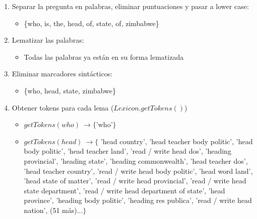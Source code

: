 \begin{enumerate}
  \item Separar la pregunta en palabras, eliminar puntuaciones y pasar a lower case:
  \begin{itemize}
    \item \{who, is, the, head, of, state, of, zimbabwe\}
  \end{itemize}
  \item Lematizar las palabras:
  \begin{itemize}
    \item Todas las palabras ya están en su forma lematizada
  \end{itemize}
  \item Eliminar marcadores sintácticos:
  \begin{itemize}
    \item \{who, head, state, zimbabwe\}
  \end{itemize}
  \item Obtener tokens para cada lema ($Lexicon.getTokens()$)
  \begin{itemize}
    \item $getTokens(who)\ \rightarrow \{$'who'$\}$
\item $getTokens(head)\ \rightarrow \{$ 'head country', 'head teacher body politic', 'head body politic', 'head teacher land', 'read / write head dos', 'heading provincial', 'heading state', 'heading commonwealth', 'head teacher dos', 'head teacher country', 'read / write head body politic', 'head word land', 'head state of matter', 'read / write head provincial', 'read / write head state department', 'read / write head department of state', 'head province', 'heading body politic', 'heading res publica', 'read / write head nation', (51 más)...$\}$


\end{itemize}
\end{enumerate}
